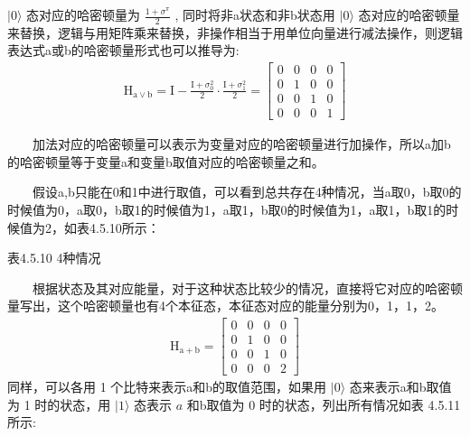 \documentclass[a4paper,11pt,english]{sphinxmanual}
\begin{document}
\sphinxAtStartPar
\(|0 \rangle\) 态对应的哈密顿量为  \(\frac{1+\sigma^{\pi}}{2}\) , 同时将非a状态和非b状态用  \(|0\rangle\) 态对应的哈密顿量来替换，逻辑与用矩阵乘来替换，非操作相当于用单位向量进行减法操作，则逻辑 表达式a或b的哈密顿量形式也可以推导为:
\begin{equation*}
\begin{split}\mathrm{H}_{\mathrm{a \lor b}}=\mathrm{I}-\frac{\mathrm{I}+\sigma_{0}^{2}}{2} \cdot \frac{\mathrm{I}+\sigma_{1}^{2}}{2}=\left[\begin{array}{llll} 0 & 0 & 0 & 0 \\ 0 & 1 & 0 & 0 \\ 0 & 0 & 1 & 0 \\ 0 & 0 & 0 & 1 \end{array}\right]\end{split}
\end{equation*}
\sphinxAtStartPar
{}

\sphinxAtStartPar
  加法对应的哈密顿量可以表示为变量对应的哈密顿量进行加操作，所以a加b的哈密顿量等于变量a和变量b取值对应的哈密顿量之和。

\sphinxAtStartPar
  假设a,b只能在0和1中进行取值，可以看到总共存在4种情况，当a取0，b取0的时候值为0，a取0，b取1的时候值为1，a取1，b取0的时候值为1，a取1，b取1的时候值为2，如表4.5.10所示：

\begin{center}表4.5.10 4种情况
\end{center}

\sphinxAtStartPar
  根据状态及其对应能量，对于这种状态比较少的情况，直接将它对应的哈密顿量写出，这个哈密顿量也有4个本征态，本征态对应的能量分别为0，1，1，2。
\begin{equation*}
\begin{split}\mathrm{H}_{\mathrm{a}+\mathrm{b}}=\left[\begin{array}{llll} 0 & 0 & 0 & 0 \\ 0 & 1 & 0 & 0 \\ 0 & 0 & 1 & 0 \\ 0 & 0 & 0 & 2 \end{array}\right]\end{split}
\end{equation*}
\sphinxAtStartPar
同样，可以各用 1 个比特来表示a和b的取值范围，如果用  \(|0\rangle\) 态来表示a和b取值为 1 时的状态，用  \(|1\rangle\) 态表示  \(a\) 和b取值为 0 时的状态，列出所有情况如表 4.5.11 所示:
\end{document}
